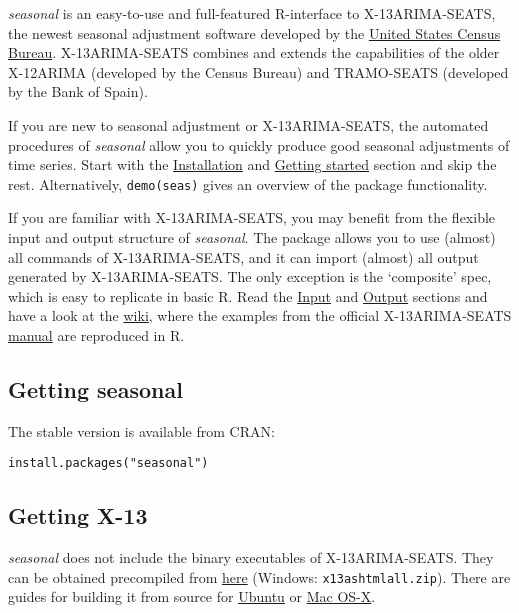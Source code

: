 \emph{seasonal} is an easy-to-use and full-featured R-interface to
X-13ARIMA-SEATS, the newest seasonal adjustment software developed by
the \href{http://www.census.gov/srd/www/x13as/}{United States Census
Bureau}. X-13ARIMA-SEATS combines and extends the capabilities of the
older X-12ARIMA (developed by the Census Bureau) and TRAMO-SEATS
(developed by the Bank of Spain).

If you are new to seasonal adjustment or X-13ARIMA-SEATS, the automated
procedures of \emph{seasonal} allow you to quickly produce good seasonal
adjustments of time series. Start with the
\hyperref[installation]{Installation} and
\hyperref[getting-started]{Getting started} section and skip the rest.
Alternatively, \texttt{demo(seas)} gives an overview of the package
functionality.

If you are familiar with X-13ARIMA-SEATS, you may benefit from the
flexible input and output structure of \emph{seasonal}. The package
allows you to use (almost) all commands of X-13ARIMA-SEATS, and it can
import (almost) all output generated by X-13ARIMA-SEATS. The only
exception is the `composite' spec, which is easy to replicate in basic
R. Read the \hyperref[input]{Input} and \hyperref[output]{Output}
sections and have a look at the
\href{https://github.com/christophsax/seasonal/wiki/Examples-of-X-13ARIMA-SEATS-in-R}{wiki},
where the examples from the official X-13ARIMA-SEATS
\href{http://www.census.gov/ts/x13as/docX13ASHTML.pdf}{manual} are
reproduced in R.


\subsection{Getting seasonal}\label{getting-seasonal}

The stable version is available from CRAN:

\begin{verbatim}
install.packages("seasonal")
\end{verbatim}

\subsection{Getting X-13}\label{getting-x-13}

\emph{seasonal} does not include the binary executables of
X-13ARIMA-SEATS. They can be obtained precompiled from
\href{http://www.census.gov/srd/www/x13as/x13down_pc.html}{here}
(Windows: \texttt{x13ashtmlall.zip}). There are guides for building it
from source for
\href{http://askubuntu.com/questions/444354/how-do-i-install-x13-arima-seats-for-rstudio-from-source}{Ubuntu}
or
\href{https://github.com/christophsax/seasonal/wiki/Compiling-X-13ARIMA-SEATS-from-Source-for-OS-X}{Mac
OS-X}.


